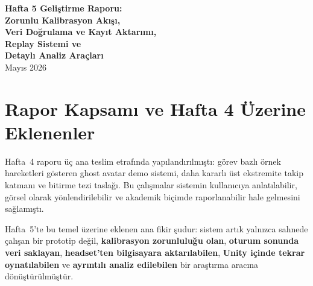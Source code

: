 \documentclass[11pt,a4paper]{article}
\begin{document}
\begin{center}
    {\LARGE\bfseries Hafta 5 Geliştirme Raporu:\\[4pt]
    \textcolor{calibblue}{Zorunlu Kalibrasyon Akışı},\\[4pt]
    \textcolor{datagreen}{Veri Doğrulama ve Kayıt Aktarımı},\\[4pt]
    \textcolor{replaypurple}{Replay Sistemi} ve\\[4pt]
    \textcolor{warnorange}{Detaylı Analiz Araçları}}\\[12pt]
    {\normalsize Mayıs 2026}
\end{center}

\vspace{6pt}

\begin{abstract}
Bu rapor, proje geliştirme sürecinin beşinci haftasında tamamlanan
kalibrasyon güvenliği, veri doğrulama, kayıt saklama, replay ve analiz
araçları çalışmalarını belgelemektedir. Hafta~4'te sistem; ghost avatar
demo gösterimleri, üst ekstremite takip katmanları ve tez taslağı ile
kullanıcıya gösterilebilir ve akademik olarak raporlanabilir hale
getirilmişti. Hafta~5'te ise odak, bu yapının gerçek build ve headset
testlerine hazırlanmasına kaymıştır. Bu kapsamda kalibrasyon yapılmadan
oyunun başlatılması engellenmiş, sonuçların doğru yorumlanması için
JSON/CSV raporları ve diagnostics kayıtları incelenmiş, örnek oyun
oturumlarından elde edilen veriler bilgisayara aktarılmış, tam oturum
replay sistemi eklenmiş ve kopyalanan kayıtların ayrıntılı analizini
sağlayan Unity Editor araçları geliştirilmiştir.
\end{abstract}

\tableofcontents
\vspace{8pt}

\section{Rapor Kapsamı ve Hafta 4 Üzerine Eklenenler}
\label{sec:kapsam}

Hafta~4 raporu üç ana teslim etrafında yapılandırılmıştı: görev bazlı
örnek hareketleri gösteren ghost avatar demo sistemi, daha kararlı üst
ekstremite takip katmanı ve bitirme tezi taslağı. Bu çalışmalar sistemin
kullanıcıya anlatılabilir, görsel olarak yönlendirilebilir ve akademik
biçimde raporlanabilir hale gelmesini sağlamıştı.

Hafta~5'te bu temel üzerine eklenen ana fikir şudur: sistem artık yalnızca
sahnede çalışan bir prototip değil, \textbf{kalibrasyon zorunluluğu olan},
\textbf{oturum sonunda veri saklayan}, \textbf{headset'ten bilgisayara
aktarılabilen}, \textbf{Unity içinde tekrar oynatılabilen} ve
\textbf{ayrıntılı analiz edilebilen} bir araştırma aracına dönüştürülmüştür.
\end{document}
